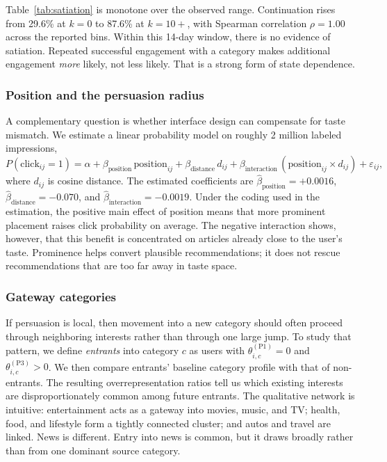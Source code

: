 \documentclass[11pt]{article}
\begin{document}
Table~\ref{tab:satiation} is monotone over the observed range. Continuation rises from 29.6\% at $k=0$ to 87.6\% at $k=10+$, with Spearman correlation $\rho = 1.00$ across the reported bins. Within this 14-day window, there is no evidence of satiation. Repeated successful engagement with a category makes additional engagement \emph{more} likely, not less likely. That is a strong form of state dependence.

\subsubsection{Position and the persuasion radius}

A complementary question is whether interface design can compensate for taste mismatch. We estimate a linear probability model on roughly 2 million labeled impressions,
\[
P(\text{click}_{ij}=1)
=
\alpha
+
\beta_{\text{position}}\,\text{position}_{ij}
+
\beta_{\text{distance}}\,d_{ij}
+
\beta_{\text{interaction}}\,(\text{position}_{ij}\times d_{ij})
+
\varepsilon_{ij},
\]
where $d_{ij}$ is cosine distance. The estimated coefficients are $\hat\beta_{\text{position}} = +0.0016$, $\hat\beta_{\text{distance}} = -0.070$, and $\hat\beta_{\text{interaction}} = -0.0019$. Under the coding used in the estimation, the positive main effect of position means that more prominent placement raises click probability on average. The negative interaction shows, however, that this benefit is concentrated on articles already close to the user's taste. Prominence helps convert plausible recommendations; it does not rescue recommendations that are too far away in taste space.

\subsubsection{Gateway categories}

If persuasion is local, then movement into a new category should often proceed through neighboring interests rather than through one large jump. To study that pattern, we define \emph{entrants} into category $c$ as users with $\theta_{i,c}^{(\mathrm{P1})}=0$ and $\theta_{i,c}^{(\mathrm{P3})}>0$. We then compare entrants' baseline category profile with that of non-entrants. The resulting overrepresentation ratios tell us which existing interests are disproportionately common among future entrants. The qualitative network is intuitive: entertainment acts as a gateway into movies, music, and TV; health, food, and lifestyle form a tightly connected cluster; and autos and travel are linked. News is different. Entry into news is common, but it draws broadly rather than from one dominant source category.
\end{document}
